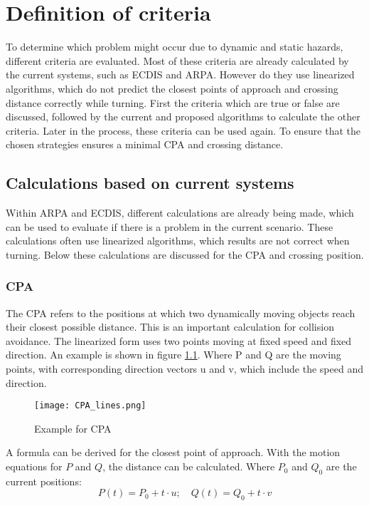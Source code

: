 \chapter{Definition of criteria}
\label{ch:criteria-problem}
To determine which problem might occur due to dynamic and static hazards, different criteria are evaluated. Most of these criteria are already calculated by the current systems, such as \ac{ECDIS} and \ac{ARPA}. However do they use linearized algorithms, which do not predict the closest points of approach and crossing distance correctly while turning. First the criteria which are true or false are discussed, followed by the current and proposed algorithms to calculate the other criteria. Later in the process, these criteria can be used again. To ensure that the chosen strategies ensures a minimal \acf{CPA} and crossing distance.

\section{Calculations based on current systems}
Within \ac{ARPA} and \ac{ECDIS}, different calculations are already being made, which can be used to evaluate if there is a problem in the current scenario. These calculations often use linearized algorithms, which results are not correct when turning. Below these calculations are discussed for the \acf{CPA} and crossing position.

\subsection{\acf{CPA}}
The \ac{CPA} refers to the positions at which two dynamically moving objects reach their closest possible distance. This is an important calculation for collision avoidance. The linearized form uses two points moving at fixed speed and fixed direction. An example is shown in figure \ref{fig:CPA}. Where P and Q are the moving points, with corresponding direction vectors u and v, which include the speed and direction.

\begin{figure}[h]
	\centering
	\texttt{[image: CPA\_lines.png]}
	\caption{Example for \acf{CPA}}
	\label{fig:CPA}
\end{figure}

A formula can be derived for the closest point of approach. With the motion equations for $P$ and $Q$, the distance can be calculated. Where $P_0$ and $Q_0$ are the current positions:
\begin{equation}
	\label{eq:motion}
	P(t) = P_0 + t \cdot u ;\quad  Q(t) = Q_0 + t \cdot v
\end{equation}

